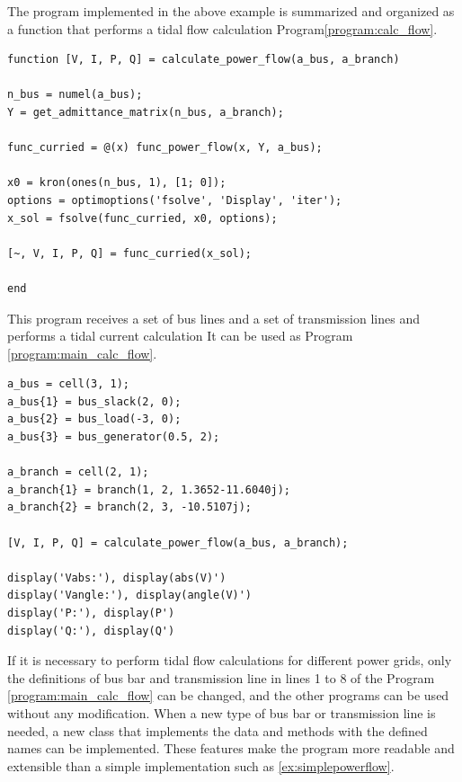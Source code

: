 \documentclass[graybox, envcountchap]{svmult}
\begin{document}
\begin{example}
The program implemented in the above example is summarized and organized as a function that performs a tidal flow calculation Program\nobreak\ref{program:calc_flow}.

\smallskip
\begin{PROGRAMA}[count,title={calculate\_power\_flow.m}]\label{program:calc_flow}
\begin{verbatim}
function [V, I, P, Q] = calculate_power_flow(a_bus, a_branch)

n_bus = numel(a_bus);
Y = get_admittance_matrix(n_bus, a_branch);

func_curried = @(x) func_power_flow(x, Y, a_bus);

x0 = kron(ones(n_bus, 1), [1; 0]);
options = optimoptions('fsolve', 'Display', 'iter');
x_sol = fsolve(func_curried, x0, options);

[~, V, I, P, Q] = func_curried(x_sol);

end
\end{verbatim}
\end{PROGRAMA}

This program receives a set of bus lines and a set of transmission lines and performs a tidal current calculation It can be used as Program \nobreak\ref{program:main_calc_flow}.

\smallskip
\begin{PROGRAMA}[count,title={main\_power\_flow.m}]\label{program:main_calc_flow}
\begin{verbatim}
a_bus = cell(3, 1);
a_bus{1} = bus_slack(2, 0);
a_bus{2} = bus_load(-3, 0);
a_bus{3} = bus_generator(0.5, 2);

a_branch = cell(2, 1);
a_branch{1} = branch(1, 2, 1.3652-11.6040j);
a_branch{2} = branch(2, 3, -10.5107j);

[V, I, P, Q] = calculate_power_flow(a_bus, a_branch);

display('Vabs:'), display(abs(V)')
display('Vangle:'), display(angle(V)')
display('P:'), display(P')
display('Q:'), display(Q')
\end{verbatim}
\end{PROGRAMA}

If it is necessary to perform tidal flow calculations for different power grids, only the definitions of bus bar and transmission line in lines 1 to 8 of the Program \nobreak\ref{program:main_calc_flow} can be changed, and the other programs can be used without any modification.
When a new type of bus bar or transmission line is needed, a new class that implements the data and methods with the defined names can be implemented.
These features make the program more readable and extensible than a simple implementation such as \ref{ex:simplepowerflow}.
\end{example}
\end{document}

